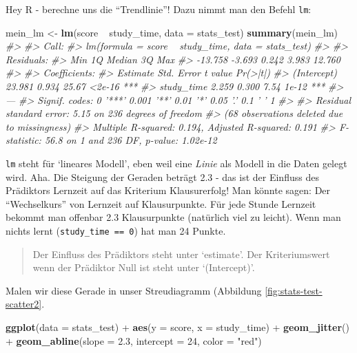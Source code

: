 \documentclass[12pt,ngerman,]{book}
\makeatletter
\newenvironment{Shaded}{\begin{snugshade}}{\end{snugshade}}
\newcommand{\KeywordTok}[1]{\textcolor[rgb]{0.13,0.29,0.53}{\textbf{{#1}}}}
\newcommand{\DataTypeTok}[1]{\textcolor[rgb]{0.13,0.29,0.53}{{#1}}}
\newcommand{\DecValTok}[1]{\textcolor[rgb]{0.00,0.00,0.81}{{#1}}}
\newcommand{\FloatTok}[1]{\textcolor[rgb]{0.00,0.00,0.81}{{#1}}}
\newcommand{\StringTok}[1]{\textcolor[rgb]{0.31,0.60,0.02}{{#1}}}
\newcommand{\CommentTok}[1]{\textcolor[rgb]{0.56,0.35,0.01}{\textit{{#1}}}}
\newcommand{\NormalTok}[1]{{#1}}
\newenvironment{kframe}{%
\medskip{}
\setlength{\fboxsep}{.8em}
 \def\at@end@of@kframe{}%
 \ifinner\ifhmode%
  \def\at@end@of@kframe{\end{minipage}}%
  \begin{minipage}{\columnwidth}%
 \fi\fi%
 \def\FrameCommand##1{\hskip\@totalleftmargin \hskip-\fboxsep
 \colorbox{shadecolor}{##1}\hskip-\fboxsep
     \hskip-\linewidth \hskip-\@totalleftmargin \hskip\columnwidth}%
 \MakeFramed {\advance\hsize-\width
   \@totalleftmargin\z@ \linewidth\hsize
   \@setminipage}}%
 {\par\unskip\endMakeFramed%
 \at@end@of@kframe}
\renewenvironment{Shaded}{\begin{kframe}}{\end{kframe}}
\theoremstyle{definition}
\theoremstyle{definition}
\theoremstyle{remark}
\makeatother
\begin{document}
Hey R - berechne uns die ``Trendlinie''! Dazu nimmt man den Befehl
\texttt{lm}:

\begin{Shaded}
\begin{Highlighting}[]
\NormalTok{mein_lm <-}\StringTok{ }\KeywordTok{lm}\NormalTok{(score ~}\StringTok{ }\NormalTok{study_time, }\DataTypeTok{data =} \NormalTok{stats_test)}
\KeywordTok{summary}\NormalTok{(mein_lm)}
\CommentTok{#> }
\CommentTok{#> Call:}
\CommentTok{#> lm(formula = score ~ study_time, data = stats_test)}
\CommentTok{#> }
\CommentTok{#> Residuals:}
\CommentTok{#>     Min      1Q  Median      3Q     Max }
\CommentTok{#> -13.758  -3.693   0.242   3.983  12.760 }
\CommentTok{#> }
\CommentTok{#> Coefficients:}
\CommentTok{#>             Estimate Std. Error t value Pr(>|t|)    }
\CommentTok{#> (Intercept)   23.981      0.934   25.67   <2e-16 ***}
\CommentTok{#> study_time     2.259      0.300    7.54    1e-12 ***}
\CommentTok{#> ---}
\CommentTok{#> Signif. codes:  0 '***' 0.001 '**' 0.01 '*' 0.05 '.' 0.1 ' ' 1}
\CommentTok{#> }
\CommentTok{#> Residual standard error: 5.15 on 236 degrees of freedom}
\CommentTok{#>   (68 observations deleted due to missingness)}
\CommentTok{#> Multiple R-squared:  0.194,  Adjusted R-squared:  0.191 }
\CommentTok{#> F-statistic: 56.8 on 1 and 236 DF,  p-value: 1.02e-12}
\end{Highlighting}
\end{Shaded}

\texttt{lm} steht für `lineares Modell', eben weil eine \emph{Linie} als
Modell in die Daten gelegt wird. Aha. Die Steigung der Geraden beträgt
2.3 - das ist der Einfluss des Prädiktors Lernzeit auf das Kriterium
Klausurerfolg! Man könnte sagen: Der ``Wechselkurs'' von Lernzeit auf
Klausurpunkte. Für jede Stunde Lernzeit bekommt man offenbar 2.3
Klausurpunkte (natürlich viel zu leicht). Wenn man nichts lernt
(\texttt{study\_time\ ==\ 0}) hat man 24 Punkte.

\begin{quote}
Der Einfluss des Prädiktors steht unter `estimate'. Der Kriteriumswert
wenn der Prädiktor Null ist steht unter `(Intercept)'.
\end{quote}

Malen wir diese Gerade in unser Streudiagramm (Abbildung
\ref{fig:stats-test-scatter2}.

\begin{Shaded}
\begin{Highlighting}[]
\KeywordTok{ggplot}\NormalTok{(}\DataTypeTok{data =} \NormalTok{stats_test) +}
\StringTok{  }\KeywordTok{aes}\NormalTok{(}\DataTypeTok{y =} \NormalTok{score, }\DataTypeTok{x =} \NormalTok{study_time) +}
\StringTok{  }\KeywordTok{geom_jitter}\NormalTok{() +}
\StringTok{  }\KeywordTok{geom_abline}\NormalTok{(}\DataTypeTok{slope =} \FloatTok{2.3}\NormalTok{, }\DataTypeTok{intercept =} \DecValTok{24}\NormalTok{, }\DataTypeTok{color =} \StringTok{"red"}\NormalTok{)}
\end{Highlighting}
\end{Shaded}
\end{document}
